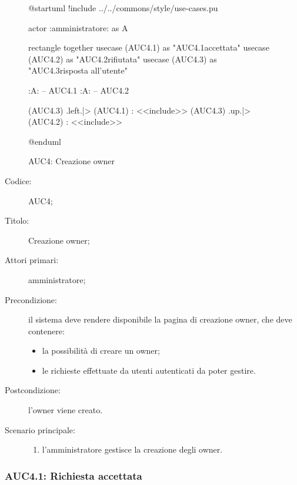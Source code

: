 \documentclass[../../../analisi-dei-requisiti.tex]{subfiles}
\begin{document}
\begin{figure}[H]
  \centering
  \begin{plantuml}
  @startuml
  !include ../../commons/style/use-cases.pu

  actor :amministratore: as A

  rectangle {
    together {
      usecase (AUC4.1) as "AUC4.1\nRichiesta accettata"
      usecase (AUC4.2) as "AUC4.2\nRichiesta rifiutata"
    }
    usecase (AUC4.3) as "AUC4.3\nInvio risposta all'utente"
  }

  :A: -- AUC4.1
  :A: -- AUC4.2

  (AUC4.3) .left.|> (AUC4.1) : <<include>>
  (AUC4.3) .up.|> (AUC4.2) : <<include>>

  @enduml
  \end{plantuml}
  \caption{AUC4: Creazione owner}%
  \label{fig:AUC4}
\end{figure}

\begin{description}
  \item[Codice:] AUC4;
  \item[Titolo:] Creazione owner;
  \item[Attori primari:] amministratore;
  \item[Precondizione:] il sistema deve rendere disponibile la pagina di creazione owner, che deve contenere:
  \begin{itemize}
    \item la possibilità di creare un owner;
    \item le richieste effettuate da utenti autenticati da poter gestire.
  \end{itemize}
  \item[Postcondizione:] l'owner viene creato.
  \item[Scenario principale:]
  \begin{enumerate}
    \item l'amministratore gestisce la creazione degli owner.
  \end{enumerate}
\end{description}


\subsubsection{AUC4.1: Richiesta accettata}%
\label{subs:AUC4.1}
\end{document}

